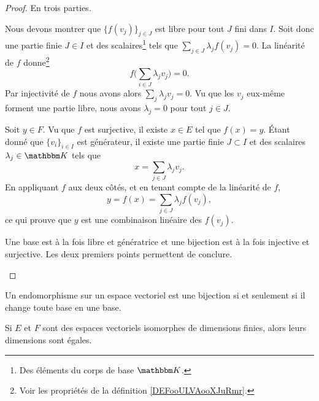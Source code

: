 \begin{proof}
    En trois parties.
    \begin{subproof}
        \item[\ref{ITEMooPPMEooIaZqtm}]
            Nous devons montrer que \( \{f(v_j)\}_{j\in J}\) est libre pour tout \( J\) fini dans \( I\). Soit donc une partie finie \( J\in I\) et des scalaires\footnote{Des éléments du corps de base \( \eK\).} tels que \( \sum_{j\in J}\lambda_jf(v_j)=0\). La linéarité de \( f\) donne\footnote{Voir les propriétés de la définition \ref{DEFooULVAooXJuRmr}.}
            \begin{equation}
                f\big( \sum_{i\in J}\lambda_jv_j \big)=0.
            \end{equation}
            Par injectivité de \( f\) nous avons alors \( \sum_j\lambda_jv_j=0\). Vu que les \( v_j\) eux-même forment une partie libre, nous avons \( \lambda_j=0\) pour tout \( j\in J\).
        \item[\ref{ITEMooOZSPooQBrDGi}]
            Soit \( y\in F\). Vu que \( f\) est surjective, il existe \( x\in E\) tel que \( f(x)=y\). Étant donné que \( \{v_i\}_{i\in I}\) est générateur, il existe une partie finie \( J\subset I\) et des scalaires \( \lambda_j\in \eK\) tels que
            \begin{equation}
                x=\sum_{j\in J}\lambda_jv_j.
            \end{equation}
            En appliquant \( f\) aux deux côtés, et en tenant compte de la linéarité de \( f\),
            \begin{equation}
                y=f(x)=\sum_{j\in J}\lambda_jf(v_j),
            \end{equation}
            ce qui prouve que \( y\) est une combinaison linéaire des \( f(v_j)\).
        \item[\ref{ITEMooOIEYooIfdFnv}]
            Une base est à la fois libre et génératrice et une bijection est à la fois injective et surjective. Les deux premiers points permettent de conclure.
    \end{subproof}
\end{proof}


\begin{lemma}        \label{LEMooDJSIooYcsvhO}
    Un endomorphisme sur un espace vectoriel est une bijection si et seulement si il change toute base en une base.
\end{lemma}

\begin{corollary}        \label{CORooXIPKooWThOsr}
    Si \( E\) et \( F\) sont des espaces vectoriels isomorphes de dimensions finies, alors leurs dimensions sont égales.
\end{corollary}

